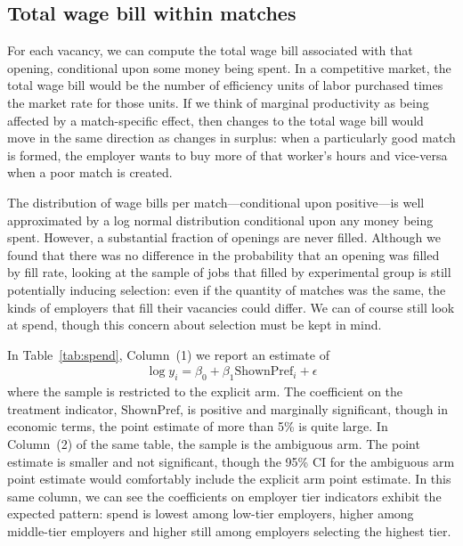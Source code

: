 \documentclass[prodmode,acmec]{ec-acmsmall}
\newcommand{\quantclaim}[1]{#1}
\begin{document}
\subsection{Total wage bill within matches} 
For each vacancy, we can compute the total wage bill associated with that opening, conditional upon some money being spent.
In a competitive market, the total wage bill would be the number of efficiency units of labor purchased times the market rate for those units.
If we think of marginal productivity as being affected by a match-specific effect, then changes to the total wage bill would move in the same direction as changes in surplus:
when a particularly good match is formed, the employer wants to buy more of that worker's hours and vice-versa when a poor match is created. 

The distribution of wage bills per match---conditional upon positive---is well approximated by a log normal distribution conditional upon any money being spent. 
However, a substantial fraction of openings are never filled.
Although we found that there was no difference in the probability that an opening was filled by fill rate, looking at the sample of jobs that filled by experimental group is still potentially inducing selection:
even if the quantity of matches was the same, the kinds of employers that fill their vacancies could differ.
We can of course still look at spend, though this concern about selection must be kept in mind. 

In Table~\ref{tab:spend}, Column~(1) we report an estimate of 
\begin{align} \label{eq:spend} 
  \log y_i = \beta_0 + \beta_1 \mbox{ShownPref}_i + \epsilon
\end{align} 
where the sample is restricted to the explicit arm.
\quantclaim{The coefficient on the treatment indicator, $\mbox{ShownPref}$, is positive and marginally significant,
  though in economic terms, the point estimate of more than 5\% is quite large.} 
In Column~(2) of the same table, the sample is the ambiguous arm. 
The point estimate is smaller and not significant, though the 95\% CI for the ambiguous arm point estimate would comfortably include the explicit arm point estimate. 
In this same column, we can see the coefficients on employer tier indicators exhibit the expected pattern:
spend is lowest among low-tier employers, higher among middle-tier employers and higher still among employers selecting the highest tier. 
\end{document}
